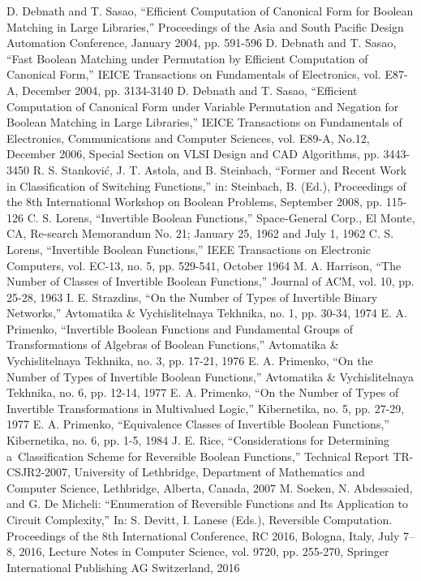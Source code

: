 \documentclass{wfiisul}
\begin{document}
	D. Debnath and T. Sasao, ``Efficient Computation of Canonical Form for Boolean Matching in Large Libraries,'' Proceedings of the Asia and South Pacific Design Automation Conference, January 2004, pp. 591-596
	D. Debnath and T. Sasao, ``Fast Boolean Matching under Permutation by Efficient Computation of Canonical Form,'' IEICE Transactions on Fundamentals of Electronics, vol. E87-A, December 2004, pp. 3134-3140
	D. Debnath and T. Sasao, ``Efficient Computation of Canonical Form under Variable Permutation and Negation for Boolean Matching in Large Libraries,'' IEICE Transactions on Fundamentals of Electronics, Communications and Computer Sciences, vol. E89-A, No.12, December 2006, Special Section on VLSI Design and CAD Algorithms, pp. 3443-3450
	R. S. Stanković, J. T. Astola, and B. Steinbach, ``Former and Recent Work in Classification of Switching Functions,'' in: Steinbach, B. (Ed.), Proceedings of the 8th International Workshop on Boolean Problems, September 2008, pp. 115-126
	C. S. Lorens, ``Invertible Boolean Functions,'' Space-General Corp., El Monte, CA, Re-search Memorandum No. 21; January 25, 1962 and July 1, 1962
	C. S. Lorens, ``Invertible Boolean Functions,'' IEEE Transactions on Electronic Computers, vol. EC-13, no. 5, pp. 529-541, October 1964
	M. A. Harrison, ``The Number of Classes of Invertible Boolean Functions,'' Journal of ACM, vol. 10, pp. 25-28, 1963
	I. E. Strazdins, ``On the Number of Types of Invertible Binary Networks,'' Avtomatika \& Vychislitelnaya Tekhnika, no. 1, pp. 30-34, 1974
	E. A. Primenko, ``Invertible Boolean Functions and Fundamental Groups of Transformations of Algebras of Boolean Functions,'' Avtomatika \& Vychislitelnaya Tekhnika, no. 3, pp. 17-21, 1976
	E. A. Primenko, ``On the Number of Types of Invertible Boolean Functions,'' Avtomatika \& Vychislitelnaya Tekhnika, no. 6, pp. 12-14, 1977
	E. A. Primenko, ``On the Number of Types of Invertible Transformations in Multivalued Logic,'' Kibernetika, no. 5, pp. 27-29, 1977
	E. A. Primenko, ``Equivalence Classes of Invertible Boolean Functions,'' Kibernetika, no. 6, pp. 1-5, 1984
	J. E. Rice, ``Considerations for Determining a~Classification Scheme for Reversible Boolean Functions,'' Technical Report TR-CSJR2-2007, University of Lethbridge, Department of Mathematics and Computer Science, Lethbridge, Alberta, Canada, 2007
	M. Soeken, N. Abdessaied, and G. De Micheli: ``Enumeration of Reversible Functions and Its Application to Circuit Complexity,'' In: S. Devitt, I. Lanese (Eds.), Reversible Computation. Proceedings of the 8th International Conference, RC 2016, Bologna, Italy, July 7–8, 2016, Lecture Notes in Computer Science, vol. 9720, pp. 255-270, Springer International Publishing AG Switzerland, 2016
\end{document}
